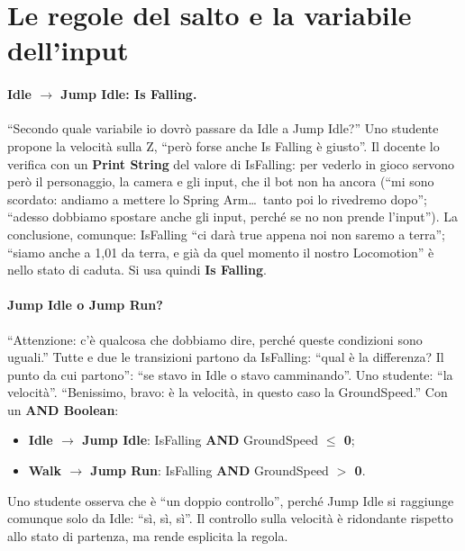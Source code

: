 \section{Le regole del salto e la variabile dell'input}
\label{ue10:sec:transizioni}

\paragraph{Idle $\rightarrow$ Jump Idle: Is Falling.} ``Secondo quale variabile io dovrò
passare da Idle a Jump Idle?'' Uno studente propone la velocità sulla Z, ``però forse
anche Is Falling è giusto''. Il docente lo verifica con un \textbf{Print String} del valore
di IsFalling: per vederlo in gioco servono però il personaggio, la camera e gli input,
che il bot non ha ancora (``mi sono scordato: andiamo a mettere lo Spring Arm\dots\ tanto
poi lo rivedremo dopo''; ``adesso dobbiamo spostare anche gli input, perché se no non
prende l'input''). La conclusione, comunque: IsFalling ``ci darà true appena noi non saremo
a terra''; ``siamo anche a 1,01 da terra, e già da quel momento il nostro Locomotion'' è
nello stato di caduta. Si usa quindi \textbf{Is Falling}.

\paragraph{Jump Idle o Jump Run?} ``Attenzione: c'è qualcosa che dobbiamo dire, perché
queste condizioni sono uguali.'' Tutte e due le transizioni partono da IsFalling: ``qual è
la differenza? Il punto da cui partono'': ``se stavo in Idle o stavo camminando''. Uno
studente: ``la velocità''. ``Benissimo, bravo: è la velocità, in questo caso la
GroundSpeed.'' Con un \textbf{AND Boolean}:
\begin{itemize}
  \item \textbf{Idle $\rightarrow$ Jump Idle}: IsFalling \textbf{AND} GroundSpeed
        \textbf{$\le$ 0};
  \item \textbf{Walk $\rightarrow$ Jump Run}: IsFalling \textbf{AND} GroundSpeed
        \textbf{$>$ 0}.
\end{itemize}
Uno studente osserva che è ``un doppio controllo'', perché Jump Idle si raggiunge comunque
solo da Idle: ``sì, sì, sì''. Il controllo sulla velocità è ridondante rispetto allo stato
di partenza, ma rende esplicita la regola.

